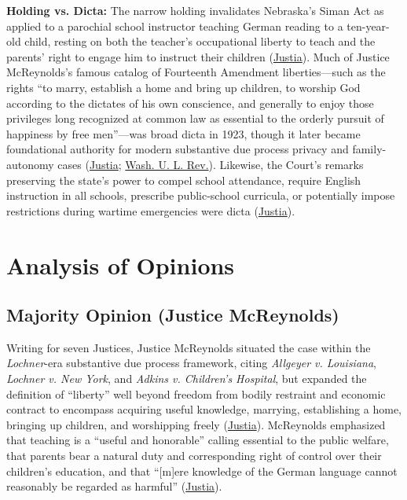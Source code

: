 \documentclass[12pt]{article}
\begin{document}
\textbf{Holding vs. Dicta:} The narrow holding invalidates Nebraska's Siman Act as applied to a parochial school instructor teaching German reading to a ten-year-old child, resting on both the teacher's occupational liberty to teach and the parents' right to engage him to instruct their children (\href{https://supreme.justia.com/cases/federal/us/262/390/}{Justia}). Much of Justice McReynolds's famous catalog of Fourteenth Amendment liberties---such as the rights ``to marry, establish a home and bring up children, to worship God according to the dictates of his own conscience, and generally to enjoy those privileges long recognized at common law as essential to the orderly pursuit of happiness by free men''---was broad dicta in 1923, though it later became foundational authority for modern substantive due process privacy and family-autonomy cases (\href{https://supreme.justia.com/cases/federal/us/262/390/}{Justia}; \href{https://wustllawreview.org/wp-content/uploads/2025/11/14_Aceves_Final-11.10-1.pdf}{Wash. U. L. Rev.}). Likewise, the Court's remarks preserving the state's power to compel school attendance, require English instruction in all schools, prescribe public-school curricula, or potentially impose restrictions during wartime emergencies were dicta (\href{https://supreme.justia.com/cases/federal/us/262/390/}{Justia}).

\section{Analysis of Opinions}

\subsection{Majority Opinion (Justice McReynolds)}

Writing for seven Justices, Justice McReynolds situated the case within the \textit{Lochner}-era substantive due process framework, citing \textit{Allgeyer v. Louisiana}, \textit{Lochner v. New York}, and \textit{Adkins v. Children's Hospital}, but expanded the definition of ``liberty'' well beyond freedom from bodily restraint and economic contract to encompass acquiring useful knowledge, marrying, establishing a home, bringing up children, and worshipping freely (\href{https://supreme.justia.com/cases/federal/us/262/390/}{Justia}). McReynolds emphasized that teaching is a ``useful and honorable'' calling essential to the public welfare, that parents bear a natural duty and corresponding right of control over their children's education, and that ``[m]ere knowledge of the German language cannot reasonably be regarded as harmful'' (\href{https://supreme.justia.com/cases/federal/us/262/390/}{Justia}).
\end{document}
